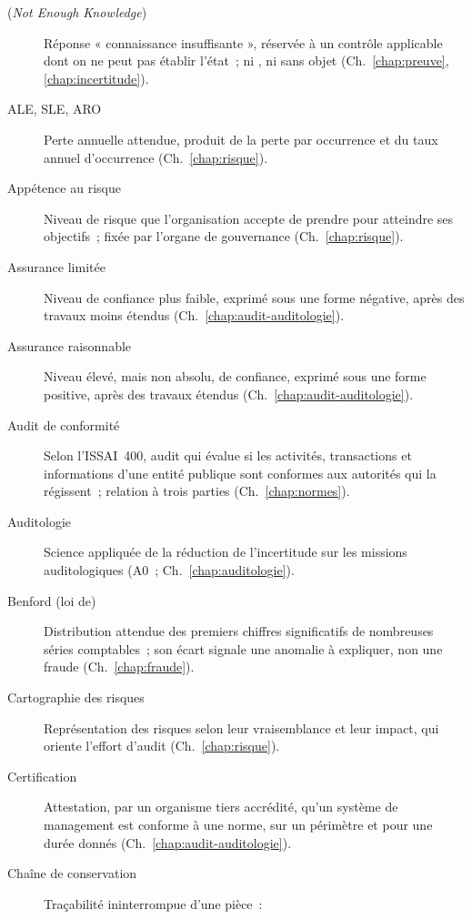 \begin{description}
    \item[\NEK{} (\textit{Not Enough Knowledge})] Réponse « connaissance
          insuffisante », réservée à un contrôle applicable dont on ne peut
          pas établir l'état~; ni \NON{}, ni sans objet
          (Ch.~\ref{chap:preuve}, \ref{chap:incertitude}).
    \item[ALE, SLE, ARO] Perte annuelle attendue, produit de la perte par
          occurrence et du taux annuel d'occurrence (Ch.~\ref{chap:risque}).
    \item[Appétence au risque] Niveau de risque que l'organisation accepte
          de prendre pour atteindre ses objectifs~; fixée par l'organe de
          gouvernance (Ch.~\ref{chap:risque}).
    \item[Assurance limitée] Niveau de confiance plus faible, exprimé sous
          une forme négative, après des travaux moins étendus
          (Ch.~\ref{chap:audit-auditologie}).
    \item[Assurance raisonnable] Niveau élevé, mais non absolu, de confiance,
          exprimé sous une forme positive, après des travaux étendus
          (Ch.~\ref{chap:audit-auditologie}).
    \item[Audit de conformité] Selon l'ISSAI~400, audit qui évalue si les
          activités, transactions et informations d'une entité publique sont
          conformes aux autorités qui la régissent~; relation à trois
          parties (Ch.~\ref{chap:normes}).
    \item[Auditologie] Science appliquée de la réduction de l'incertitude
          sur les missions auditologiques (A0~; Ch.~\ref{chap:auditologie}).
    \item[Benford (loi de)] Distribution attendue des premiers chiffres
          significatifs de nombreuses séries comptables~; son écart signale
          une anomalie à expliquer, non une fraude (Ch.~\ref{chap:fraude}).
    \item[Cartographie des risques] Représentation des risques selon leur
          vraisemblance et leur impact, qui oriente l'effort d'audit
          (Ch.~\ref{chap:risque}).
    \item[Certification] Attestation, par un organisme tiers accrédité,
          qu'un système de management est conforme à une norme, sur un
          périmètre et pour une durée donnés (Ch.~\ref{chap:audit-auditologie}).
    \item[Chaîne de conservation] Traçabilité ininterrompue d'une pièce~:

\end{description}
